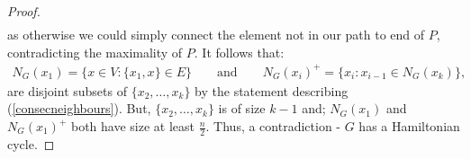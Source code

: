 \begin{proof}
\begin{equation*}
\begin{aligned}
      \end{aligned}
  \end{equation*}
  as otherwise we could simply connect the element not in our
  path to end of $P$, contradicting the maximality of $P$.
  It follows that: \begin{gather*}
      N_G(x_1) = \{x \in V : \{x_1, x\} \in E\} \qquad
      \text{and} \qquad
      N_G(x_i)^+ = \{x_i : x_{i - 1} \in N_G(x_k)\},
  \end{gather*} are disjoint subsets of $\{x_2, \ldots, x_k\}$
  by the statement describing (\ref{consecneighbours}).
  But, $\{x_2, \ldots, x_k\}$ is of size $k - 1$ and; 
  $N_G(x_1)$ and $N_G(x_1)^+$ both have size at least $\frac{n}{2}$.
  Thus, a contradiction - $G$ has a Hamiltonian cycle.
\end{proof}
